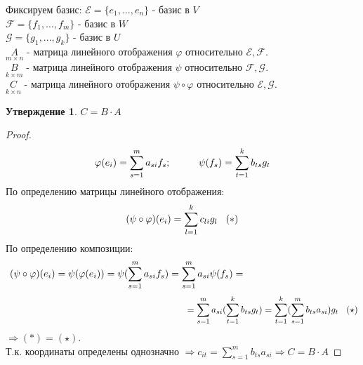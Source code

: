 \documentclass[a4paper, 12pt]{article}
\renewcommand{\phi}{\varphi}
\newcommand\tab[1][.5cm]{\hspace*{#1}}
\theoremstyle{definition}
\newtheorem*{subtheorem}{Утверждение}
\begin{document}
\begin{itemize}
    Фиксируем базис: \tab[0.3cm]$\mathcal{E} = \{e_1,...,e_n\}$ - базис в $V$ \\
    \tab[4.3cm]$\mathcal{F} = \{f_1,...,f_m\}$ - базис в $W$ \\
    \tab[4.3cm]$\mathcal{G} = \{g_1,...,g_k\}$ - базис в $U$ \\
    $\underset{m \times n}{A}$ - матрица линейного отображения $\phi$ относительно $\mathcal{E}, \mathcal{F}$. \\
    $\underset{k \times m}{B}$ - матрица линейного отображения $\psi$ относительно $\mathcal{F}, \mathcal{G}$. \\
    $\underset{k \times n}{C}$ - матрица линейного отображения $\psi \circ \phi$ относительно $\mathcal{E}, \mathcal{G}$.
    \begin{subtheorem}
      $C = B \cdot A$ 
    \end{subtheorem} 
    \begin{proof}
      $$\phi(e_i) = \sum \limits_{s=1}^ma_{si}f_s; \tab[1cm]\psi(f_s) = \sum \limits_{t=1}^kb_{ts}g_t$$
      По определению матрицы линейного отображения:
      $$(\psi \circ \phi)(e_i) = \sum \limits_{l=1}^kc_{li}g_l \tab[0.3cm](\ast)$$ 
      По определению композиции:
      $$(\psi \circ \phi)(e_i) = \psi(\phi(e_i)) = \psi(\sum \limits_{s=1}^ma_{si}f_s) = \sum \limits_{s=1}^ma_{si}\psi(f_s) =\tab[4cm]$$ $$\tab[7cm]= \sum \limits_{s=1}^ma_{si}(\sum \limits_{t=1}^kb_{ts}g_t) = \sum \limits_{t=1}^k(\sum \limits_{s=1}^mb_{ts}a_{si})g_t \tab[0.3cm](\star)$$
      $\Longrightarrow $$(\ast) = (\star)$.\\
      Т.к. координаты определены однозначно $\Rightarrow c_{it} = \sum \limits_{s=1}^mb_{ts}a_{si} \Rightarrow C =B \cdot A$  
    \end{proof} 
  \end{itemize}
\end{document}
